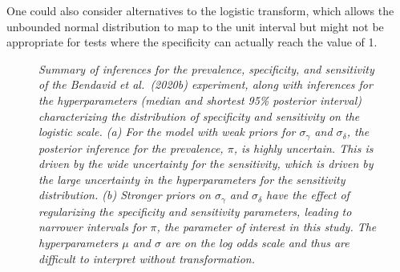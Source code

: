 \documentclass[11pt]{article}
\begin{document}
One could also consider alternatives to the logistic transform, which allows the unbounded normal distribution to map to the unit interval but might not be appropriate for tests where the specificity can actually reach the value of 1.

\begin{figure}
  \caption{\em Summary of inferences for the prevalence, specificity, and sensitivity of the Bendavid et al.\ (2020b) experiment, along with inferences for the hyperparameters (median and shortest 95\% posterior interval) characterizing the distribution of specificity and sensitivity on the logistic scale.  (a) For the model with weak priors for $\sigma_{\gamma}$ and $\sigma_{\delta}$, the posterior inference for the prevalence, $\pi$, is highly uncertain.  This is driven by the wide uncertainty for the sensitivity, which is driven by the large uncertainty in the hyperparameters for the sensitivity distribution. (b) Stronger priors on  $\sigma_{\gamma}$ and $\sigma_{\delta}$ have the effect of regularizing the specificity and sensitivity parameters, leading to narrower intervals for $\pi$, the parameter of interest in this study.  The hyperparameters $\mu$ and $\sigma$ are on the log odds scale and thus are difficult to interpret without transformation.}
\label{posterior2}
\end{figure}
\end{document}
